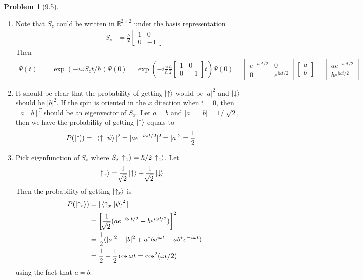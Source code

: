 \documentclass[twoside,11pt]{article}
\newcommand{\RR}{\mathbb{R}}
\theoremstyle{definition}
\newtheorem{problem}{Problem}
\theoremstyle{remark}
\begin{document}
\begin{problem}[9.5]
\begin{enumerate}[label=(\alph*)]
\item Note that $S_z$ could be written in $\RR^{2\times 2}$
under the basis representation
\begin{align*}
    S_z &= \frac{\hbar}{2}\begin{bmatrix}
        1 & 0 \\ 0 & -1
    \end{bmatrix}
\end{align*}
Then
\begin{align*}
    \Psi(t) &= \exp(-i\omega S_zt/\hbar)\Psi(0)
    = \exp\left(
        -i\frac{\omega}{\hbar}\frac{\hbar}{2}\begin{bmatrix}
            1 & 0 \\ 0 & -1
        \end{bmatrix}t
    \right)\Psi(0)
    = \begin{bmatrix}
        e^{-i\omega t/2} & 0\\ 0 & e^{i\omega t/2}
    \end{bmatrix}\begin{bmatrix}
        a\\b
    \end{bmatrix}
    =
    \begin{bmatrix}
        ae^{-i\omega t/2}\\
        be^{i\omega t/2}
    \end{bmatrix}
\end{align*}

\item It should be clear that the probability of getting
$\ket{\uparrow}$ would be $|a|^2$ and $\ket{\downarrow}$ should
be $|b|^2$.
If the spin is oriented in the $x$ direction when $t=0$, 
then $[a\quad b]^T$ should be an eigenvector of $S_x$.
Let $a=b$ and $|a|=|b|=1/\sqrt[]{2}$, then we have the probability
of getting $\ket{\uparrow}$ equals to 
\begin{align*}
    P(\ket{\uparrow}) &= |\braket{\uparrow|\psi}|^2 = |ae^{-i\omega t/2}|^2 = |a|^2 = \frac{1}{2}
\end{align*}

\item Pick eigenfunction of $S_x$ where $S_x\ket{\uparrow_x} = \hbar/2\ket{\uparrow_x}$.
Let
\begin{align*}
    \ket{\uparrow_x} &= \frac{1}{\sqrt[]{2}}\ket{\uparrow} + \frac{1}{\sqrt[]{2}}\ket{\downarrow}
\end{align*}
Then the probability of getting $\ket{\uparrow_x}$ is
\begin{align*}
    P(\ket{\uparrow_x}) &= |\braket{\uparrow_x|\psi}^2|\\
    &= 
    \left[\frac{1}{\sqrt[]{2}}(ae^{-i\omega t/2} + be^{i\omega t/2})\right]^2\\
    &= \frac{1}{2}(|a|^2 + |b|^2 + a^*be^{i\omega t}+ab^*e^{-i\omega t})\\
    &= \frac{1}{2} + \frac{1}{2}\cos\omega t = \cos^2(\omega t/2)
\end{align*}
using the fact that $a=b$.


\end{enumerate}
\end{problem}
\end{document}
